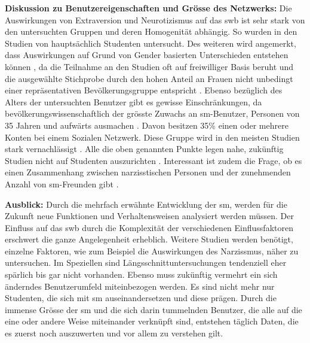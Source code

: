 \textbf{Diskussion zu Benutzereigenschaften und Grösse des Netzwerks:}\newline
Die Auswirkungen von Extraversion und Neurotizismus auf das \gls{swb} ist sehr stark von den untersuchten Gruppen und deren Homogenität abhängig. So wurden in den Studien von  hauptsächlich Studenten untersucht. Des weiteren wird angemerkt, dass Auswirkungen auf Grund von Gender basierten Unterschieden entstehen können \cite{Special:2012}, da die Teilnahme an den Studien oft auf freiwilliger Basis beruht und die ausgewählte Stichprobe durch den hohen Anteil an Frauen nicht unbedingt einer repräsentativen Bevölkerungsgruppe entspricht \cite{Manago:2012}. Ebenso bezüglich des Alters der untersuchten Benutzer gibt es gewisse Einschränkungen, da bevölkerungswissenschaftlich der grösste Zuwachs an \gls{sm}-Benutzer, Personen von 35 Jahren und aufwärts ausmachen \cite{Lenhart:2009}. Davon besitzen 35\%  einen oder mehrere Konten bei einem Sozialen Netzwerk. Diese Gruppe wird in den meisten Studien stark vernachlässigt \cite{Special:2012}. Alle die oben genannten Punkte legen nahe, zukünftig Studien nicht auf Studenten auszurichten \cite{Kim:2011}. Interessant ist zudem die Frage, ob es einen Zusammenhang zwischen narzisstischen Personen und der zunehmenden Anzahl von \gls{sm}-Freunden gibt \cite{Manago:2012}. %
\par 
\textbf{Ausblick:}\newline
Durch die mehrfach erwähnte Entwicklung der \gls{sm}, werden für die Zukunft neue Funktionen und Verhaltensweisen analysiert werden müssen. Der Einfluss auf das \gls{swb} durch die Komplexität der verschiedenen Einflussfaktoren erschwert die ganze Angelegenheit erheblich. Weitere Studien werden benötigt, einzelne Faktoren, wie zum Beispiel die Auswirkungen des Narzissmus, näher zu untersuchen. Im Speziellen sind Längsschnittuntersuchungen tendenziell eher spärlich bis gar nicht vorhanden. Ebenso muss zukünftig vermehrt ein sich änderndes Benutzerumfeld miteinbezogen werden. Es sind nicht mehr nur Studenten, die sich mit \gls{sm} auseinandersetzen und diese prägen.\newline
Durch die immense Grösse der \gls{sm} und die sich darin tummelnden Benutzer, die alle auf die eine oder andere Weise miteinander verknüpft sind, entstehen täglich Daten, die es zuerst noch auszuwerten und vor allem zu verstehen gilt.
